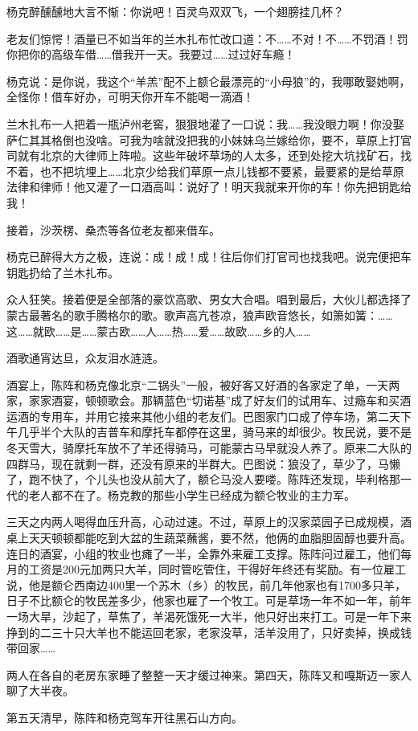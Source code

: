 \par 杨克醉醺醺地大言不惭：你说吧！百灵鸟双双飞，一个翅膀挂几杯？
\par 老友们惊愕！酒量已不如当年的兰木扎布忙改口道：不……不对！不……不罚酒！罚你把你的高级车借……借我开一天。我要过……过过好车瘾！
\par 杨克说：是你说，我这个“羊羔”配不上额仑最漂亮的“小母狼”的，我哪敢娶她啊，全怪你！借车好办，可明天你开车不能喝一滴酒！
\par 兰木扎布一人把着一瓶泸州老窖，狠狠地灌了一口说：我……我没眼力啊！你没娶萨仁其其格倒也没啥。可我为啥就没把我的小妹妹乌兰嫁给你，要不，草原上打官司就有北京的大律师上阵啦。这些年破坏草场的人太多，还到处挖大坑找矿石，找不着，也不把坑埋上……北京少给我们草原一点儿钱都不要紧，最要紧的是给草原法律和律师！他又灌了一口酒高叫：说好了！明天我就来开你的车！你先把钥匙给我！
\par 接着，沙茨楞、桑杰等各位老友都来借车。
\par 杨克已醉得大方之极，连说：成！成！成！往后你们打官司也找我吧。说完便把车钥匙扔给了兰木扎布。
\par 众人狂笑。接着便是全部落的豪饮高歌、男女大合唱。唱到最后，大伙儿都选择了蒙古最著名的歌手腾格尔的歌。歌声高亢苍凉，狼声欧音悠长，如箫如簧：……这……就欧……是……蒙古欧……人……热……爱……故欧……乡的人……
\par 酒歌通宵达旦，众友泪水涟涟。
\par 酒宴上，陈阵和杨克像北京“二锅头”一般，被好客又好酒的各家定了单，一天两家，家家酒宴，顿顿歌会。那辆蓝色“切诺基”成了好友们的试用车、过瘾车和买酒运酒的专用车，并用它接来其他小组的老友们。巴图家门口成了停车场，第二天下午几乎半个大队的吉普车和摩托车都停在这里，骑马来的却很少。牧民说，要不是冬天雪大，骑摩托车放不了羊还得骑马，可能蒙古马早就没人养了。原来二大队的四群马，现在就剩一群，还没有原来的半群大。巴图说：狼没了，草少了，马懒了，跑不快了，个儿头也没从前大了，额仑马没人要喽。陈阵还发现，毕利格那一代的老人都不在了。杨克教的那些小学生已经成为额仑牧业的主力军。
\par 三天之内两人喝得血压升高，心动过速。不过，草原上的汉家菜园子已成规模，酒桌上天天顿顿都能吃到大盆的生蔬菜蘸酱，要不然，他俩的血脂胆固醇也要升高。连日的酒宴，小组的牧业也瘫了一半，全靠外来雇工支撑。陈阵问过雇工，他们每月的工资是200元加两只大羊，同时管吃管住，干得好年终还有奖励。有一位雇工说，他是额仑西南边400里一个苏木（乡）的牧民，前几年他家也有1700多只羊，日子不比额仑的牧民差多少，他家也雇了一个牧工。可是草场一年不如一年，前年一场大旱，沙起了，草焦了，羊渴死饿死一大半，他只好出来打工。可是一年下来挣到的二三十只大羊也不能运回老家，老家没草，活羊没用了，只好卖掉，换成钱带回家……
\par 两人在各自的老房东家睡了整整一天才缓过神来。第四天，陈阵又和嘎斯迈一家人聊了大半夜。
\par 第五天清早，陈阵和杨克驾车开往黑石山方向。




